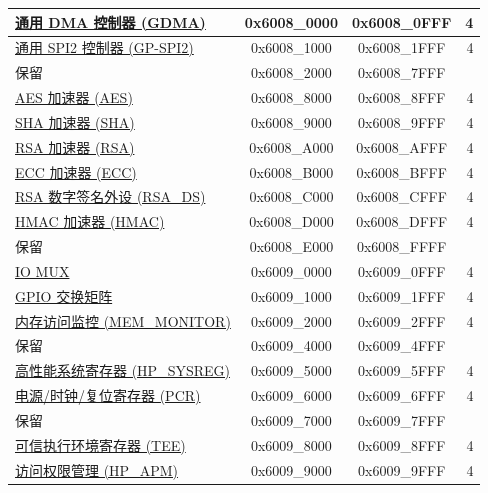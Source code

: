 \begin{ThreePartTable}
\begin{longtable}[c]{ |p{7cm}|c|c|r| }
\hyperref[mod:dma]{通用 DMA 控制器 (GDMA)}& 0x6008\_0000 & 0x6008\_0FFF &   4     \\\hline
\hyperref[mod:spi]{通用 SPI2 控制器 (GP-SPI2)} & 0x6008\_1000 & 0x6008\_1FFF &   4     \\\hline
    \rowcolor{gray!25}  保留                    & 0x6008\_2000 & 0x6008\_7FFF &         \\\hline
\hyperref[mod:aes]{AES 加速器 (AES)} & 0x6008\_8000 & 0x6008\_8FFF &   4     \\\hline
\hyperref[mod:sha]{SHA 加速器 (SHA)} & 0x6008\_9000 & 0x6008\_9FFF &   4     \\\hline
\hyperref[mod:rsa]{RSA 加速器 (RSA)}& 0x6008\_A000 & 0x6008\_AFFF &   4     \\\hline
\hyperref[mod:ecc]{ECC 加速器 (ECC)}& 0x6008\_B000 & 0x6008\_BFFF &   4     \\\hline
\hyperref[mod:digsig]{RSA 数字签名外设 (RSA\_DS)}  & 0x6008\_C000 & 0x6008\_CFFF &   4     \\\hline
\hyperref[mod:hmac]{HMAC 加速器 (HMAC)}& 0x6008\_D000 & 0x6008\_DFFF &   4     \\\hline
    \rowcolor{gray!25}  保留                    & 0x6008\_E000 & 0x6008\_FFFF &         \\\hline
\hyperref[mod:iomuxgpio]{IO MUX}                      & 0x6009\_0000 & 0x6009\_0FFF &   4     \\\hline
\hyperref[mod:iomuxgpio]{GPIO 交换矩阵}& 0x6009\_1000 & 0x6009\_1FFF &   4     \\\hline
\hyperref[mod:dbgassist]{内存访问监控 (MEM\_MONITOR)}\tnote{\textcolor{red}{*}}                & 0x6009\_2000 & 0x6009\_2FFF &   4   \\\hline
    \rowcolor{gray!25}  保留                    & 0x6009\_4000 & 0x6009\_4FFF &         \\\hline
\hyperref[mod:sysreg]{高性能系统寄存器 (HP\_SYSREG)}               & 0x6009\_5000 & 0x6009\_5FFF &   4     \\\hline
\hyperref[mod:resclk]{电源/时钟/复位寄存器 (PCR)}                     & 0x6009\_6000 & 0x6009\_6FFF &   4     \\\hline
    \rowcolor{gray!25}  保留                    & 0x6009\_7000 & 0x6009\_7FFF &         \\\hline
\hyperref[mod:permctrl]{可信执行环境寄存器 (TEE)}\tnote{\textcolor{red}{*}}                     & 0x6009\_8000 & 0x6009\_8FFF &   4 \\\hline
\hyperref[mod:permctrl]{访问权限管理 (HP\_APM)}\tnote{\textcolor{red}{*}}                      & 0x6009\_9000 & 0x6009\_9FFF &   4 \\\hline

\end{longtable}
\end{ThreePartTable}
